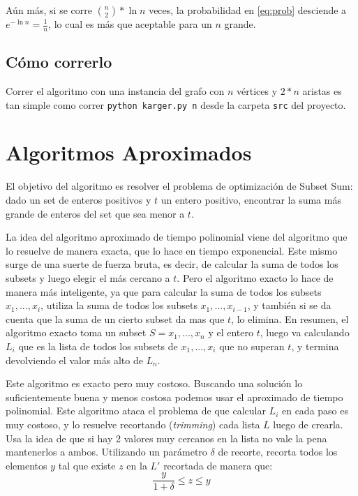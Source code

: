 \documentclass[a4paper,10pt]{article}
\begin{document}
Aún más, si se corre $\binom{n}{2}*\ln n$ veces, la probabilidad en \ref{eq:prob} desciende a $e^{-\ln n} = \frac{1}{n}$, lo cual es más que aceptable para un $n$ grande.

\subsection{Cómo correrlo}
Correr el algoritmo con una instancia del grafo con $n$ vértices y $2*n$ aristas es tan simple como correr \texttt{python karger.py n} desde la carpeta \texttt{src} del proyecto.

\section{Algoritmos Aproximados}
El objetivo del algoritmo es resolver el problema de optimización de Subset Sum: dado un set de enteros positivos y $t$ un entero positivo, encontrar la suma más grande de enteros del set que sea menor a $t$.

La idea del algoritmo aproximado de tiempo polinomial viene del algoritmo que lo resuelve de manera exacta, que lo hace en tiempo exponencial. Este mismo surge de una suerte de fuerza bruta, es decir, de calcular la suma de todos los subsets y luego elegir el más cercano a $t$. Pero el algoritmo exacto lo hace de manera más inteligente, ya que para calcular la suma de todos los subsets ${x_1,...,x_i}$, utiliza la suma de todos los subsets ${x_1,...,x_{i-1}}$, y también si se da cuenta que la suma de un cierto subset da mas que $t$, lo elimina. En resumen, el algoritmo exacto toma un subset $S={x_1,...,x_n}$ y el entero $t$, luego va calculando $L_i$ que es la lista de todos los subsets de ${x_1,...,x_i}$ que no superan $t$, y termina devolviendo el valor más alto de $L_n$.

Este algoritmo es exacto pero muy costoso. Buscando una solución lo suficientemente buena y menos costosa podemos usar el aproximado de tiempo polinomial. Este algoritmo ataca el problema de que calcular $L_i$ en cada paso es muy costoso, y lo resuelve recortando (\textit{trimming}) cada lista $L$ luego de crearla. Usa la idea de que si hay 2 valores muy cercanos en la lista no vale la pena mantenerlos a ambos. Utilizando un parámetro $\delta$ de recorte, recorta todos los elementos $y$ tal que existe $z$ en la $L'$ recortada de manera que:
\begin{equation}
	\label{eq:delta}
	\dfrac{y} {1+\delta} \leq z \leq y \tag{3.1}
\end{equation}
\end{document}
